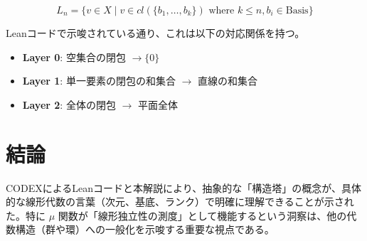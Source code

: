 \documentclass[11pt, a4paper]{article}
\begin{document}
\[ L_n = \{ v \in X \mid v \in cl(\{b_1, \dots, b_k\}) \text{ where } k \le n, b_i \in \text{Basis} \} \]

Leanコードで示唆されている通り、これは以下の対応関係を持つ。
\begin{itemize}
    \item \textbf{Layer 0}: 空集合の閉包 $\to \{0\}$
    \item \textbf{Layer 1}: 単一要素の閉包の和集合 $\to$ 直線の和集合
    \item \textbf{Layer 2}: 全体の閉包 $\to$ 平面全体
\end{itemize}

\section{結論}

CODEXによるLeanコードと本解説により、抽象的な「構造塔」の概念が、具体的な線形代数の言葉（次元、基底、ランク）で明確に理解できることが示された。特に $\mu$ 関数が「線形独立性の測度」として機能するという洞察は、他の代数構造（群や環）への一般化を示唆する重要な視点である。
\end{document}
